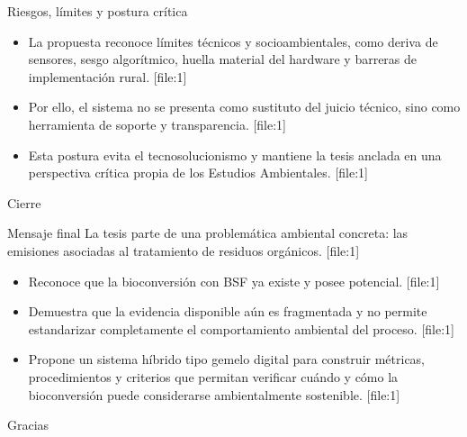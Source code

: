 \documentclass[10pt,aspectratio=169]{beamer}
\newcommand{\basecite}{\hfill{\color{griscita}\tiny [file:1]}}
\begin{document}
\begin{frame}{Riesgos, límites y postura crítica}
\justifying
\begin{itemize}
    \item La propuesta reconoce límites técnicos y socioambientales, como deriva de sensores, sesgo algorítmico, huella material del hardware y barreras de implementación rural. \basecite
    \item Por ello, el sistema no se presenta como sustituto del juicio técnico, sino como herramienta de soporte y transparencia. \basecite
    \item Esta postura evita el tecnosolucionismo y mantiene la tesis anclada en una perspectiva crítica propia de los Estudios Ambientales. \basecite
\end{itemize}
\end{frame}

\begin{frame}{Cierre}
\justifying
\begin{block}{Mensaje final}
La tesis parte de una problemática ambiental concreta: las emisiones asociadas al tratamiento de residuos orgánicos. \basecite
\end{block}

\begin{itemize}
    \item Reconoce que la bioconversión con BSF ya existe y posee potencial. \basecite
    \item Demuestra que la evidencia disponible aún es fragmentada y no permite estandarizar completamente el comportamiento ambiental del proceso. \basecite
    \item Propone un sistema híbrido tipo gemelo digital para construir métricas, procedimientos y criterios que permitan verificar cuándo y cómo la bioconversión puede considerarse ambientalmente sostenible. \basecite
\end{itemize}
\end{frame}

\begin{frame}
\centering
{\Huge Gracias}
\end{frame}
\end{document}
